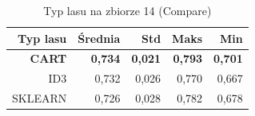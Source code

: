 \begin{table}[htbp]
\centering
\small
\setlength{\tabcolsep}{6pt}
\renewcommand{\arraystretch}{1.2}
\caption{Typ lasu na zbiorze 14 (Compare)}
\label{tab:Compare_on_14}
\begin{tabular}{r|r|r|r|r}
\toprule
Typ lasu & Średnia & Std & Maks & Min \\
\hline
\textbf{CART} & \textbf{0,734} & \textbf{0,021} & \textbf{0,793} & \textbf{0,701} \\
ID3 & 0,732 & 0,026 & 0,770 & 0,667 \\
SKLEARN & 0,726 & 0,028 & 0,782 & 0,678 \\
\bottomrule
\end{tabular}
\end{table}